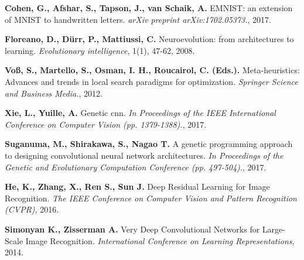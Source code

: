 \documentclass[eng]{simposium}
\begin{document}
\begin{thebibliography}{99}
\textbf{Cohen, G., Afshar, S., Tapson, J., van Schaik, A.} EMNIST: an extension of MNIST to handwritten letters. \emph{arXiv preprint arXiv:1702.05373.}, 2017.

\textbf{Floreano, D., Dürr, P., Mattiussi, C.} Neuroevolution: from architectures to learning. \emph{Evolutionary intelligence}, 1(1), 47-62, 2008.

\textbf{Voß, S., Martello, S., Osman, I. H., Roucairol, C. (Eds.).} Meta-heuristics: Advances and trends in local search paradigms for optimization. \emph{Springer Science and Business Media.}, 2012.

\textbf{Xie, L., Yuille, A. } Genetic cnn. \emph{In Proceedings of the IEEE International Conference on Computer Vision (pp. 1379-1388).}, 2017.

\textbf{Suganuma, M., Shirakawa, S., Nagao T. } A genetic programming approach to designing convolutional neural network architectures. \emph{In Proceedings of the Genetic and Evolutionary Computation Conference (pp. 497-504).}, 2017.

\textbf{He, K., Zhang, X., Ren S., Sun J.} Deep Residual Learning for Image Recognition. \emph{The IEEE Conference on Computer Vision and Pattern Recognition (CVPR)}, 2016.

\textbf{Simonyan K., Zisserman A.} Very Deep Convolutional Networks for Large-Scale Image Recognition. \emph{International Conference on Learning Representations}, 2014.

\end{thebibliography}
\end{document}
